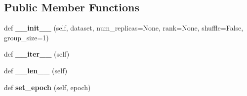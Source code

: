 \subsection*{Public Member Functions}
\begin{DoxyCompactItemize}
\item 
\mbox{\label{classtorchvision_1_1datasets_1_1samplers_1_1clip__sampler_1_1DistributedSampler_a68561142d84425656a8f4327e85ff0fa}} 
def {\bfseries \+\_\+\+\_\+init\+\_\+\+\_\+} (self, dataset, num\+\_\+replicas=None, rank=None, shuffle=False, group\+\_\+size=1)
\item 
\mbox{\label{classtorchvision_1_1datasets_1_1samplers_1_1clip__sampler_1_1DistributedSampler_a3e8756c73c238bbadf7d1e7c86c2f1b4}} 
def {\bfseries \+\_\+\+\_\+iter\+\_\+\+\_\+} (self)
\item 
\mbox{\label{classtorchvision_1_1datasets_1_1samplers_1_1clip__sampler_1_1DistributedSampler_a9be211b9025fc9a8bb64bb3b025856b7}} 
def {\bfseries \+\_\+\+\_\+len\+\_\+\+\_\+} (self)
\item 
\mbox{\label{classtorchvision_1_1datasets_1_1samplers_1_1clip__sampler_1_1DistributedSampler_a39a5da4e6004283c82f6c38ed940655d}} 
def {\bfseries set\+\_\+epoch} (self, epoch)
\end{DoxyCompactItemize}
